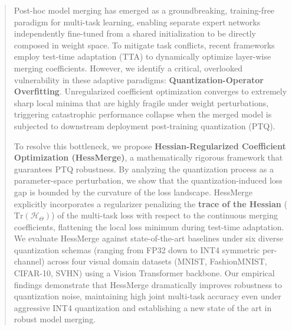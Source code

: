 \begin{abstract}
Post-hoc model merging has emerged as a groundbreaking, training-free paradigm for multi-task learning, enabling separate expert networks independently fine-tuned from a shared initialization to be directly composed in weight space. To mitigate task conflicts, recent frameworks employ test-time adaptation (TTA) to dynamically optimize layer-wise merging coefficients. However, we identify a critical, overlooked vulnerability in these adaptive paradigms: \textbf{Quantization-Operator Overfitting}. Unregularized coefficient optimization converges to extremely sharp local minima that are highly fragile under weight perturbations, triggering catastrophic performance collapse when the merged model is subjected to downstream deployment post-training quantization (PTQ). 

To resolve this bottleneck, we propose \textbf{Hessian-Regularized Coefficient Optimization (HessMerge)}, a mathematically rigorous framework that guarantees PTQ robustness. By analyzing the quantization process as a parameter-space perturbation, we show that the quantization-induced loss gap is bounded by the curvature of the loss landscape. HessMerge explicitly incorporates a regularizer penalizing the \textbf{trace of the Hessian} ($\text{Tr}(\mathcal{H}_{\Theta})$) of the multi-task loss with respect to the continuous merging coefficients, flattening the local loss minimum during test-time adaptation. We evaluate HessMerge against state-of-the-art baselines under six diverse quantization schemas (ranging from FP32 down to INT4 symmetric per-channel) across four visual domain datasets (MNIST, FashionMNIST, CIFAR-10, SVHN) using a Vision Transformer backbone. Our empirical findings demonstrate that HessMerge dramatically improves robustness to quantization noise, maintaining high joint multi-task accuracy even under aggressive INT4 quantization and establishing a new state of the art in robust model merging.
\end{abstract}
